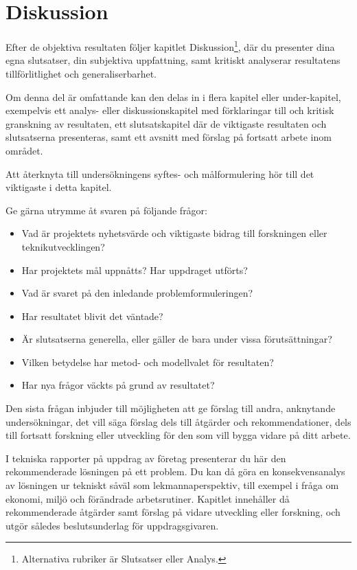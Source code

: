 \chapter{Diskussion}
\label{ch:discussion}
\noindent
Efter de objektiva resultaten följer kapitlet Diskussion\footnote{%
	Alternativa rubriker är Slutsatser eller Analys.
}, där du presenter dina egna slutsatser, din subjektiva uppfattning, samt 
kritiskt analyserar resultatens tillförlitlighet och generaliserbarhet.

Om denna del är omfattande kan den delas in i flera kapitel eller 
under-kapitel, exempelvis ett analys- eller diskussionskapitel med förklaringar 
till och kritisk granskning av resultaten, ett slutsatskapitel där de 
viktigaste resultaten och slutsatserna presenteras, samt ett avsnitt med 
förslag på fortsatt arbete inom området.

Att återknyta till undersökningens syftes- och målformulering hör till det 
viktigaste i detta kapitel.

Ge gärna utrymme åt svaren på följande frågor:
\begin{itemize}
	\item Vad är projektets nyhetsvärde och viktigaste bidrag till forskningen 
		eller teknikutvecklingen?
	\item Har projektets mål uppnåtts? Har uppdraget utförts?
	\item Vad är svaret på den inledande problemformuleringen?
	\item Har resultatet blivit det väntade?
	\item Är slutsatserna generella, eller gäller de bara under vissa 
		förutsättningar?
	\item Vilken betydelse har metod- och modellvalet för resultaten?
	\item Har nya frågor väckts på grund av resultatet?
\end{itemize}

Den sista frågan inbjuder till möjligheten att ge förslag till andra, 
anknytande undersökningar, det vill säga förslag dels till åtgärder och 
rekommendationer, dels till fortsatt forskning eller utveckling för den som 
vill bygga vidare på ditt arbete.

I tekniska rapporter på uppdrag av företag presenterar du här den 
rekommenderade lösningen på ett problem.
Du kan då göra en konsekvensanalys av lösningen ur tekniskt såväl som 
lekmannaperspektiv, till exempel i fråga om ekonomi, miljö och förändrade 
arbetsrutiner.
Kapitlet innehåller då rekommenderade åtgärder samt förslag på vidare 
utveckling eller forskning, och utgör således beslutsunderlag för 
uppdragsgivaren.
